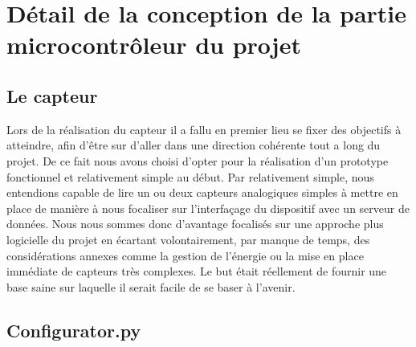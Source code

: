 \section{Détail de la conception de la partie microcontrôleur du projet}
	\subsection{Le capteur}
		Lors de la réalisation du capteur il a fallu en premier lieu se fixer
		des objectifs à atteindre, afin d'être sur d'aller dans une direction
		cohérente tout a long du projet. De  ce fait nous avons choisi d'opter pour
		la réalisation d'un prototype fonctionnel et relativement simple au début.
		Par relativement simple, nous entendions capable de lire un ou deux capteurs
		analogiques simples à mettre en place de manière à nous focaliser sur
		l'interfaçage du dispositif avec un serveur de données. Nous nous sommes
		donc d'avantage focalisés sur une approche plus logicielle du projet en
		écartant volontairement, par manque de temps, des considérations annexes
		comme la gestion de l'énergie ou la mise en place immédiate de capteurs
		très complexes. Le but était réellement de fournir une base saine sur laquelle
		il serait facile de se baser à l'avenir.
		\par
	
	\subsection{Configurator.py}
